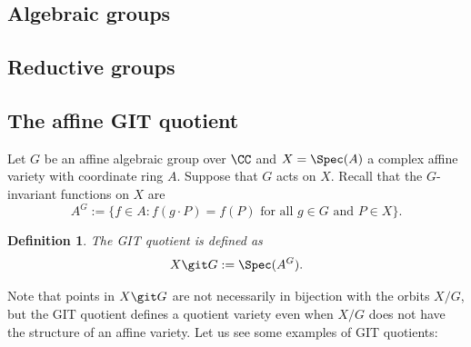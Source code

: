 \documentclass[12pt]{amsart}
\theoremstyle{plain}
\newtheorem{definition}[theorem]{Definition}
\begin{document}
\subsection{Algebraic groups}



\subsection{Reductive groups}



\subsection{The affine GIT quotient}
Let $G$ be an affine algebraic group over $\CC$ and $X = \Spec(A)$ a complex affine variety with coordinate ring $A$.
Suppose that $G$ acts on $X$.
Recall that the $G$-invariant functions on $X$ are
$$A^G := \{f \in A : f(g \cdot P) = f(P) \text{ for all } g \in G \text{ and } P \in X\}.$$

\begin{definition}
The GIT quotient is defined as
$$X \git G := \Spec(A^G).$$
\end{definition}

Note that points in $X \git G$ are not necessarily in bijection with the orbits $X / G$, but the GIT quotient defines a quotient variety even when $X / G$ does not have the structure of an affine variety.
Let us see some examples of GIT quotients:
\end{document}
